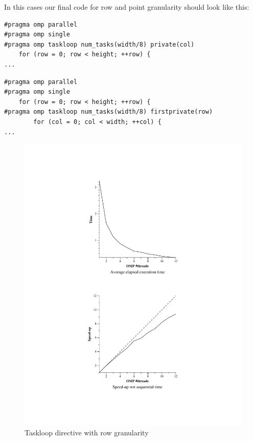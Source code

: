 \documentclass[11pt]{article}
\begin{document}
In this cases our final code for row and point granularity should look like this:

\begin{verbatim}
#pragma omp parallel
#pragma omp single
#pragma omp taskloop num_tasks(width/8) private(col)
    for (row = 0; row < height; ++row) {
...
\end{verbatim}
\begin{verbatim}
#pragma omp parallel
#pragma omp single
    for (row = 0; row < height; ++row) {
#pragma omp taskloop num_tasks(width/8) firstprivate(row)
        for (col = 0; col < width; ++col) {
...
\end{verbatim}

\begin{figure}[!htb]
  \begin{minipage}[t]{0.48\textwidth}
    \centerline{\includegraphics[width=1.5\linewidth]{./Taskloop/row/row.pdf}}
    \caption{Taskloop directive with row granularity}
  \end{minipage}
  \begin{minipage}[t]{0.48\textwidth}

\end{minipage}
\end{figure}
\end{document}
